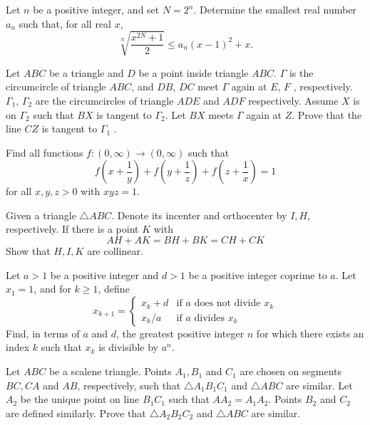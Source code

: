 \documentclass[11pt]{scrartcl}
\begin{document}
\begin{problem}[9026100911884959358]
Let $n$ be a positive integer, and set $N=2^{n}$. Determine the smallest real number $a_{n}$ such that, for all real $x$,
\[
\sqrt[N]{\frac{x^{2 N}+1}{2}} \leqslant a_{n}(x-1)^{2}+x .
\]
\end{problem}
\begin{problem}[6209707374283278028]
Let $ABC$ be a triangle and $D$ be a point inside triangle $ABC$. $\Gamma$ is the circumcircle of triangle $ABC$, and $DB$, $DC$ meet $\Gamma$ again at $E$, $F$ , respectively. $\Gamma_1$, $\Gamma_2$ are the circumcircles of triangle $ADE$ and $ADF$ respectively. Assume $X$ is on $\Gamma_2$ such that $BX$ is tangent to $\Gamma_2$. Let $BX$ meets $\Gamma$ again at $Z$. Prove that the line $CZ$ is tangent to $\Gamma_1$ .
\end{problem}
\begin{problem}[3626448942281457521]
	Find all functions $f:(0,\infty) \rightarrow (0,\infty)$ such that\[f\left(x+\frac{1}{y}\right)+f\left(y+\frac{1}{z}\right) + f\left(z+\frac{1}{x}\right) = 1\]for all $x,y,z >0$ with $xyz =1$.
\end{problem}
\begin{problem}[3906812380515301028]
Given a triangle $ \triangle ABC $. Denote its incenter and orthocenter by $ I, H $, respectively. If there is a point $ K $ with$$ AH+AK = BH+BK = CH+CK $$Show that $ H, I, K $ are collinear.
\end{problem}
\begin{problem}[3159161448000677570]
Let $a > 1$ be a positive integer and $d > 1$ be a positive integer coprime to $a$. Let $x_1=1$, and for $k\geq 1$, define
$$x_{k+1} = \begin{cases}
x_k + d &\text{if } a \text{ does not divide } x_k \\
x_k/a & \text{if } a \text{ divides } x_k
\end{cases}$$Find, in terms of $a$ and $d$, the greatest positive integer $n$ for which there exists an index $k$ such that $x_k$ is divisible by $a^n$.
\end{problem}
\begin{problem}[3031913484181592371]
Let $ABC$ be a scalene triangle. Points $A_1,B_1$ and $C_1$ are chosen on segments $BC,CA$ and $AB$, respectively, such that $\triangle A_1B_1C_1$ and $\triangle ABC$ are similar. Let $A_2$ be the unique point on line $B_1C_1$ such that $AA_2=A_1A_2$. Points $B_2$ and $C_2$ are defined similarly. Prove that $\triangle A_2B_2C_2$ and $\triangle ABC$ are similar.
\end{problem}
\end{document}
